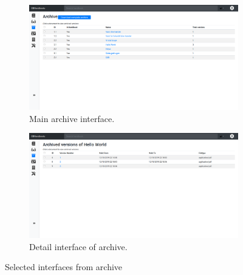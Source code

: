 \begin{figure}[H]
	\centering
	\begin{subfigure}[b]{0.48\textwidth}
		\includegraphics[width=\textwidth]{billeder/iteration3Prototyper/Archive1.png}
		\caption{Main archive interface.}
		\label{fig:5-Archive1}
	\end{subfigure}
	\quad
	\begin{subfigure}[b]{0.48\textwidth}
		\includegraphics[width=\textwidth]{billeder/iteration3Prototyper/Archive2.png}
		\caption{Detail interface of archive.}
		\label{fig:5-Archive2}
	\end{subfigure}
	\caption{Selected interfaces from archive}\label{fig:5-Archives}
\end{figure}

